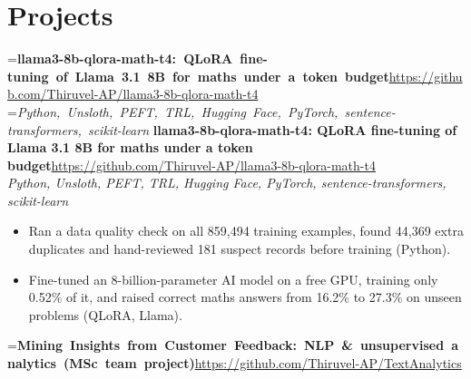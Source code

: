 \documentclass[a4paper,11pt]{article}
\newcommand{\project}[3]{%
  \textbf{#1}\hfill#3\\ {\color{muted}\small\textit{#2}}\par}
\newcommand{\gap}{\vspace{5pt}}
\begin{document}
\section{Projects}
=\hbox{\textbf{llama3-8b-qlora-math-t4: QLoRA fine-tuning of Llama 3.1 8B for maths under a token budget}\hspace{1em}\url{https://github.com/Thiruvel-AP/llama3-8b-qlora-math-t4}}%
=\hbox{{\small\textit{Python, Unsloth, PEFT, TRL, Hugging Face, PyTorch, sentence-transformers, scikit-learn}}}%
\ifdim\wd0>\linewidth
\ifdim\wd2>\linewidth
\textbf{llama3-8b-qlora-math-t4: QLoRA fine-tuning of Llama 3.1 8B for maths under a token budget}\\ {\color{muted}\small\textit{Python, Unsloth, PEFT, TRL, Hugging Face, PyTorch, sentence-transformers, scikit-learn}}\\ \hspace*{\fill}{\small\url{https://github.com/Thiruvel-AP/llama3-8b-qlora-math-t4}}\par
\else
\textbf{llama3-8b-qlora-math-t4: QLoRA fine-tuning of Llama 3.1 8B for maths under a token budget}\\ {\color{muted}\small\textit{Python, Unsloth, PEFT, TRL, Hugging Face, PyTorch, sentence-transformers, scikit-learn}}\hfill{\small\url{https://github.com/Thiruvel-AP/llama3-8b-qlora-math-t4}}\par
\fi
\else
\project{llama3-8b-qlora-math-t4: QLoRA fine-tuning of Llama 3.1 8B for maths under a token budget}{Python, Unsloth, PEFT, TRL, Hugging Face, PyTorch, sentence-transformers, scikit-learn}{\url{https://github.com/Thiruvel-AP/llama3-8b-qlora-math-t4}}
\fi
\begin{itemize}
  \item Ran a data quality check on all 859,494 training examples, found 44,369 extra duplicates and hand-reviewed 181 suspect records before training (Python).
  \item Fine-tuned an 8-billion-parameter AI model on a free GPU, training only 0.52\% of it, and raised correct maths answers from 16.2\% to 27.3\% on unseen problems (QLoRA, Llama).
\end{itemize}
\gap
{}
=\hbox{\textbf{Mining Insights from Customer Feedback: NLP \& unsupervised analytics (MSc team project)}\hspace{1em}\url{https://github.com/Thiruvel-AP/TextAnalytics}}%
\end{document}
